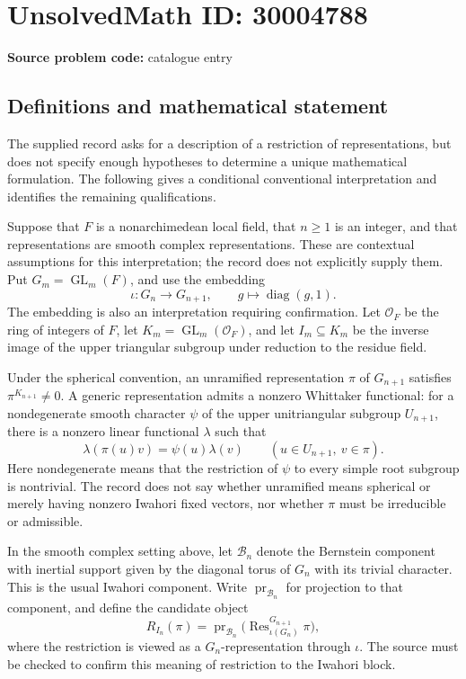 \documentclass[11pt]{article}
\begin{document}
\section*{UnsolvedMath ID: 30004788}
\textbf{Source problem code:} catalogue entry
\subsection{Definitions and mathematical statement}
The supplied record asks for a description of a restriction of representations, but does not specify enough hypotheses to determine a unique mathematical formulation. The following gives a conditional conventional interpretation and identifies the remaining qualifications.

Suppose that \(F\) is a nonarchimedean local field, that \(n\geq 1\) is an integer, and that representations are smooth complex representations. These are contextual assumptions for this interpretation; the record does not explicitly supply them. Put \(G_m=\operatorname{GL}_m(F)\), and use the embedding
\[
\iota:G_n\longrightarrow G_{n+1},\qquad g\longmapsto\operatorname{diag}(g,1).
\]
The embedding is also an interpretation requiring confirmation. Let \(\mathcal O_F\) be the ring of integers of \(F\), let \(K_m=\operatorname{GL}_m(\mathcal O_F)\), and let \(I_m\subseteq K_m\) be the inverse image of the upper triangular subgroup under reduction to the residue field.

Under the spherical convention, an unramified representation \(\pi\) of \(G_{n+1}\) satisfies \(\pi^{K_{n+1}}\neq 0\). A generic representation admits a nonzero Whittaker functional: for a nondegenerate smooth character \(\psi\) of the upper unitriangular subgroup \(U_{n+1}\), there is a nonzero linear functional \(\lambda\) such that
\[
\lambda(\pi(u)v)=\psi(u)\lambda(v)
\qquad(u\in U_{n+1},\ v\in\pi).
\]
Here nondegenerate means that the restriction of \(\psi\) to every simple root subgroup is nontrivial. The record does not say whether unramified means spherical or merely having nonzero Iwahori fixed vectors, nor whether \(\pi\) must be irreducible or admissible.

In the smooth complex setting above, let \(\mathcal B_n\) denote the Bernstein component with inertial support given by the diagonal torus of \(G_n\) with its trivial character. This is the usual Iwahori component. Write \(\operatorname{pr}_{\mathcal B_n}\) for projection to that component, and define the candidate object
\[
R_{I_n}(\pi)=\operatorname{pr}_{\mathcal B_n}\bigl(\operatorname{Res}_{\iota(G_n)}^{G_{n+1}}\pi\bigr),
\]
where the restriction is viewed as a \(G_n\)-representation through \(\iota\). The source must be checked to confirm this meaning of restriction to the Iwahori block.
\end{document}
